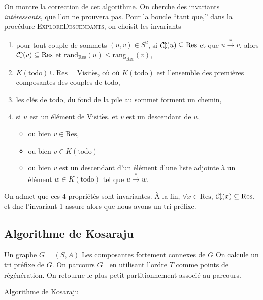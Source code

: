 On montre la correction de cet algorithme. On cherche des invariants \textit{intéressants}, que l'on ne prouvera pas. Pour la boucle ``tant que,'' dans la procédure \textsc{ExploreDescendants}, on choisit les invariants
\begin{enumerate}
	\item pour tout couple de sommets $(u,v) \in S^2$, si $\operatorname{\mathcal{C\!\!\,l}}(u) \subseteq \mathrm{Res}$\/ et que $u\xrightarrow* v$, alors $\operatorname{\mathcal{C\!\!\,l}}(v) \subseteq \mathrm{Res}$\/ et $\mathrm{rand}_{\mathrm{Res}}(u) \le \mathrm{rang}_{\mathrm{Res}}(v)$,
	\item $K(\mathrm{todo}) \cup \mathrm{Res} = \mathrm{Visit\acute es}$, où où $K(\mathrm{todo})$\/ est l'ensemble des premières composantes des couples de $\mathrm{todo}$,
	\item les clés de $\mathrm{todo}$, du fond de la pile au sommet forment un chemin,
	\item si $u$\/ est un élément de $\mathrm{Visit\acute es}$, et $v$\/ est un descendant de $u$,
		\begin{itemize}
			\item ou bien $v \in \mathrm{Res}$,
			\item ou bien $v \in K(\mathrm{todo})$\/ 
			\item ou bien $v$\/ est un descendant d'un élément d'une liste adjointe à un élément $w \in K(\mathrm{todo})$\/ tel que $u \xrightarrow* w$.
		\end{itemize}
\end{enumerate}
On admet que ces 4 propriétés sont invariantes.
À la fin, $\forall x \in \mathrm{Res}$, $\operatorname{\mathcal{C\!\!\,l}}(x) \subseteq \mathrm{Res}$, et dnc l'invariant 1 assure alors que nous avons un tri préfixe.

\subsection{Algorithme de Kosaraju}

\begin{algorithm}[H]
	\centering
	\begin{algorithmic}[1]
		\Entree Un graphe $G = (S, A)$\/ 
		\Sortie Les composantes fortement connexes de $G$\/ 
		\State On calcule un tri préfixe de $G$.
		\State On parcours $G^\top$\/ en utilisant l'ordre $T$\/ comme points de régénération.
		\State On retourne le plus petit partitionnement associé au parcours.
	\end{algorithmic}
	\caption{Algorithme de Kosaraju}
\end{algorithm}

